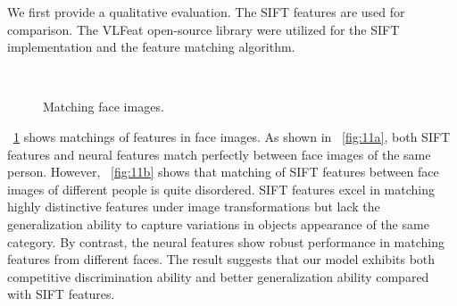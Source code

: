 \documentclass[twocolumn]{article}
\begin{document}
We first provide a qualitative evaluation.
The SIFT features \cite{lowe1999} are used for comparison.
The VLFeat open-source library \cite{vedaldi2010} were utilized for the SIFT implementation and the feature matching algorithm.

\begin{figure}[!t]
\centering
  \\
\caption{Matching face images.}
\label{fig:11}
\end{figure}

\figurename~\ref{fig:11} shows matchings of features in face images.
As shown in \figurename~\ref{fig:11a}, both SIFT features and neural features match perfectly between face images of the same person.
However, \figurename~\ref{fig:11b} shows that matching of SIFT features between face images of different people is quite disordered.
SIFT features excel in matching highly distinctive features under image transformations
but lack the generalization ability to capture variations in objects appearance of the same category.
By contrast, the neural features show robust performance in matching features from different faces.
The result suggests that our model exhibits both competitive discrimination ability and better generalization ability compared with SIFT features.
\end{document}
